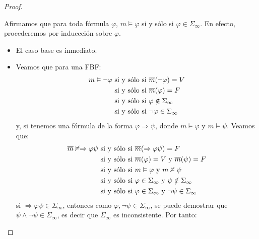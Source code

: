 \documentclass[12pt]{report}
\theoremstyle{largebreak}
\begin{document}
\begin{proof}
\begin{itemize}
            Afirmamos que para toda fórmula $\varphi$, $m\vDash\varphi$ si y sólo si $\varphi\in\Sigma_{\infty}$. En efecto, procederemos por induccción sobre $\varphi$.
            \begin{itemize}
                \item El caso base es inmediato.
                \item Veamos que para una FBF:
                \begin{equation*}
                    \begin{split}
                        m\vDash\neg\varphi&\textup{ si y sólo si }\overline{m}(\neg\varphi)=V\\
                        &\textup{ si y sólo si }\overline{m}(\varphi)=F\\
                        &\textup{ si y sólo si }\varphi\notin\Sigma_{\infty}\\
                        &\textup{ si y sólo si }\neg\varphi\in\Sigma_{\infty}\\
                    \end{split}
                \end{equation*}
                y, si tenemos una fórmula de la forma $\varphi\Rightarrow\psi$, donde $m\vDash\varphi$ y $m\vDash\psi$. Veamos que:
                \begin{equation*}
                    \begin{split}
                        \overline{m}\nvDash\Rightarrow\varphi\psi&\textup{ si y sólo si }\overline{m}(\Rightarrow\varphi\psi)=F\\
                        &\textup{ si y sólo si }\overline{m}(\varphi)=V\textup{ y }\overline{m}(\psi)=F\\
                        &\textup{ si y sólo si }m\vDash\varphi\textup{ y }m\nvDash\psi\\
                        &\textup{ si y sólo si }\varphi\in\Sigma_{\infty}\textup{ y }\psi\notin\Sigma_{\infty}\\
                        &\textup{ si y sólo si }\varphi\in\Sigma_{\infty}\textup{ y }\neg\psi\in\Sigma_{\infty}\\
                    \end{split}
                \end{equation*}
                si $\Rightarrow\varphi\psi\in\Sigma_{\infty}$, entonces como $\varphi,\neg\psi\in\Sigma_\infty$, se puede demostrar que $\psi\land\neg\psi\in\Sigma_{\infty}$, es decir que $\Sigma_{\infty}$ es inconsistente. Por tanto:

\end{itemize}
\end{itemize}
\end{proof}
\end{document}
